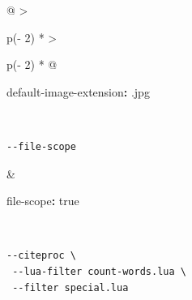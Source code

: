 \documentclass[
]{article}
\newenvironment{Shaded}{}{}
\newcommand{\AttributeTok}[1]{\textcolor[rgb]{0.49,0.56,0.16}{#1}}
\newcommand{\CharTok}[1]{\textcolor[rgb]{0.25,0.44,0.63}{#1}}
\newcommand{\FunctionTok}[1]{\textcolor[rgb]{0.02,0.16,0.49}{#1}}
\newcommand{\KeywordTok}[1]{\textcolor[rgb]{0.00,0.44,0.13}{\textbf{#1}}}
\newcommand{\StringTok}[1]{\textcolor[rgb]{0.25,0.44,0.63}{#1}}
\begin{document}
\begin{longtable}[]{@{}
  >{\raggedright\arraybackslash}p{(\columnwidth - 2\tabcolsep) * }
  >{\raggedright\arraybackslash}p{(\columnwidth - 2\tabcolsep) * }@{}}
\begin{minipage}[t]{\linewidth}
\begin{Shaded}
\begin{Highlighting}[]
\FunctionTok{default{-}image{-}extension}\KeywordTok{:}\AttributeTok{ }\StringTok{\textquotesingle{}.jpg\textquotesingle{}}
\end{Highlighting}
\end{Shaded}
\end{minipage} \\
\begin{minipage}[t]{\linewidth}\raggedright
\begin{verbatim}
--file-scope
\end{verbatim}
\end{minipage} & \begin{minipage}[t]{\linewidth}\raggedright
\begin{Shaded}
\begin{Highlighting}[]
\FunctionTok{file{-}scope}\KeywordTok{:}\AttributeTok{ }\CharTok{true}
\end{Highlighting}
\end{Shaded}
\end{minipage} \\
\begin{minipage}[t]{\linewidth}\raggedright
\begin{verbatim}
--citeproc \
 --lua-filter count-words.lua \
 --filter special.lua


\end{verbatim}
\end{minipage}
\end{longtable}
\end{document}
